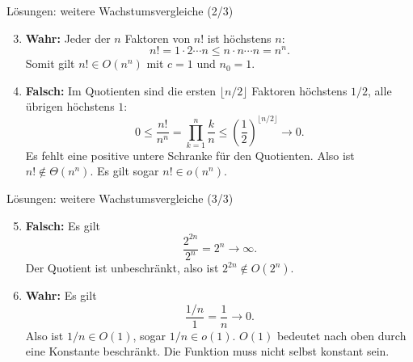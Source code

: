 \begin{frame}{Lösungen: weitere Wachstumsvergleiche (2/3)}
	\begin{myanswer}
		\begin{enumerate}
			\setcounter{enumi}{2}
			\item \textbf{Wahr:} Jeder der $n$ Faktoren von $n!$ ist höchstens $n$:
			\[
				n!=1\cdot2\cdots n\leq n\cdot n\cdots n=n^n.
			\]
			Somit gilt $n!\in O(n^n)$ mit $c=1$ und $n_0=1$.
			\item \textbf{Falsch:} Im Quotienten sind die ersten $\lfloor n/2\rfloor$ Faktoren höchstens $1/2$, alle übrigen höchstens $1$:
			\[
				0\leq\frac{n!}{n^n}
				=\prod_{k=1}^n\frac{k}{n}
				\leq\left(\frac12\right)^{\lfloor n/2\rfloor}\longrightarrow 0.
			\]
			Es fehlt eine positive untere Schranke für den Quotienten. Also ist $n!\notin\Theta(n^n)$. Es gilt sogar $n!\in o(n^n)$.
		\end{enumerate}
	\end{myanswer}
\end{frame}

\begin{frame}{Lösungen: weitere Wachstumsvergleiche (3/3)}
	\begin{myanswer}
		\begin{enumerate}
			\setcounter{enumi}{4}
			\item \textbf{Falsch:} Es gilt
			\[
				\frac{2^{2n}}{2^n}=2^n\longrightarrow\infty.
			\]
			Der Quotient ist unbeschränkt, also ist $2^{2n}\notin O(2^n)$.
			\item \textbf{Wahr:} Es gilt
			\[
				\frac{1/n}{1}=\frac1n\longrightarrow 0.
			\]
			Also ist $1/n\in O(1)$, sogar $1/n\in o(1)$. $O(1)$ bedeutet nach oben durch eine Konstante beschränkt. Die Funktion muss nicht selbst konstant sein.
		\end{enumerate}
	\end{myanswer}
\end{frame}


